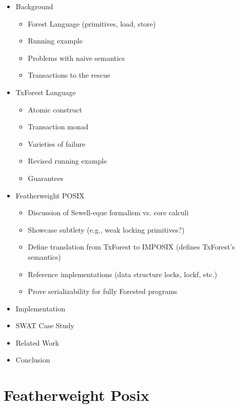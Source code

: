 \documentclass[nocopyrightspace]{sigplanconf}
\begin{document}
\begin{itemize}
\item Background
\begin{itemize}
\item Forest Language (primitives, load, store)
\item Running example 
\item Problems with naive semantics
\item Transactions to the rescue
\end{itemize}
\item TxForest Language
\begin{itemize}
\item Atomic construct 
\item Transaction monad
\item Varieties of failure
\item Revised running example
\item Guarantees
\end{itemize}
\item Featherweight POSIX
\begin{itemize}
\item Discussion of Sewell-eque formalism vs. core calculi  
\item Showcase subtlety (e.g., weak locking primitives?)
\item Define translation from TxForest to IMPOSIX (defines TxForest's semantics)
\item Reference implementations (data structure locks, lockf, etc.)
\item Prove serializability for fully Forested programs
\end{itemize}
\item Implementation
\item SWAT Case Study
\item Related Work
\item Conclusion
\end{itemize}





\section{Featherweight Posix}
\label{sec:posix}



 
\balance  

\end{document}
